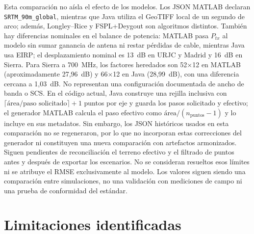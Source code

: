 Esta comparación no aísla el efecto de los modelos. Los JSON MATLAB declaran
\texttt{SRTM\_90m\_global}, mientras que Java utiliza el GeoTIFF local de un segundo de
arco; además, Longley--Rice y FSPL+Deygout son algoritmos distintos. También hay diferencias
nominales en el balance de potencia: MATLAB pasa $P_{tx}$ al modelo sin sumar ganancia de
antena ni restar pérdidas de cable, mientras Java usa EIRP; el desplazamiento nominal es
13~dB en URJC y Madrid y 16~dB en Sierra. Para Sierra a 700~MHz, los factores heredados son 52$\times$12 en MATLAB
(aproximadamente 27,96~dB) y 66$\times$12 en Java (28,99~dB), con una diferencia cercana a
1,03~dB. No representan una configuración documentada de ancho de banda o SCS. En el código
actual, Java construye una rejilla inclusiva con
$\lceil\text{área}/\text{paso solicitado}\rceil+1$ puntos por eje y guarda los pasos
solicitado y efectivo; el generador MATLAB calcula el paso efectivo como
$\text{área}/(n_\text{puntos}-1)$ y lo incluye en sus metadatos. Sin embargo, los JSON
históricos usados en esta comparación no se regeneraron, por lo que no incorporan estas
correcciones del generador ni constituyen una nueva comparación con artefactos armonizados.
Siguen pendientes de reconciliación el terreno efectivo y el filtrado de puntos antes y
después de exportar los escenarios. No se consideran resueltos esos límites ni se atribuye
el RMSE exclusivamente al modelo. Los valores siguen siendo una comparación entre
simulaciones, no una validación con mediciones de campo ni una prueba de conformidad del
estándar.

\section{Limitaciones identificadas}
\label{sec:limitaciones}

